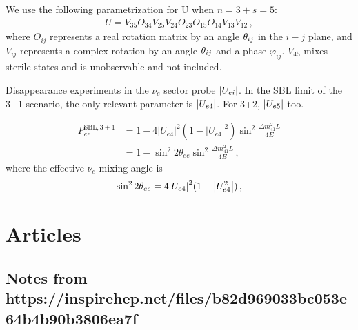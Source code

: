 \documentclass[twocolumn]{article}
\renewcommand{\ne}{\ensuremath{\nu_e}}
\renewcommand{\th}[1][]{%
  \theta\ifx\\#1\\\else_\text{#1}\fi
}
\begin{document}
We use the following parametrization for U when $n = 3+s = 5$:
\begin{align*}
  U=V_{35} O_{34} V_{25} V_{24} O_{23} O_{15} O_{14} V_{13} V_{12}
\,,\end{align*}
where $O_{ij}$ represents a real rotation matrix by an angle $\th_{ij}$ in the $i-j$ plane, and $V_{ij}$ represents a complex rotation by an angle $\th_{ij}$ and a phase $\varphi_{ij}$. $V_{45}$ mixes sterile states and is unobservable and not included. 

Disappearance experiments in the $\ne$ sector probe $\abs{U_{ei}}$. In the SBL limit of the 3+1 scenario, the only relevant parameter is $\abs{U_{e4}}$. For 3+2, $\abs{U_{e5}}$ too.

\begin{align*}
  P_{e e}^{\mathrm{SBL}, 3+1}
  &=1-4\left|U_{e 4}\right|^{2}\left(1-\left|U_{e 4}\right|^{2}\right) \sin ^{2} \frac{\Delta m_{41}^{2} L}{4 E} \\
  &=1-\sin ^{2} 2 \theta_{e e} \sin ^{2} \frac{\Delta m_{41}^{2} L}{4 E}
\,,\end{align*}
where the effective $\ne$ mixing angle is 
\begin{align*}
  \sin^2 2\theta_{ee} = 4 \abs{U_{e4}}^2(1 - \abs{U_{e4}^2})
\,,\end{align*}

\section*{Articles}
\subsection*{Notes from https://inspirehep.net/files/b82d969033bc053e64b4b90b3806ea7f}
\end{document}
